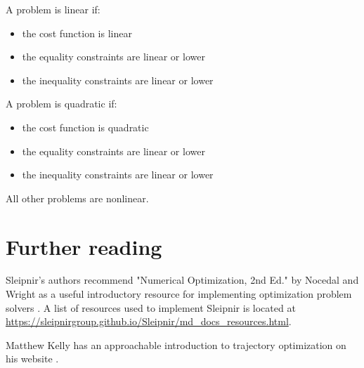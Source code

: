 A problem is linear if:
\begin{itemize}
  \item the cost function is linear
  \item the equality constraints are linear or lower
  \item the inequality constraints are linear or lower
\end{itemize}

A problem is quadratic if:
\begin{itemize}
  \item the cost function is quadratic
  \item the equality constraints are linear or lower
  \item the inequality constraints are linear or lower
\end{itemize}

All other problems are nonlinear.

\section{Further reading}

Sleipnir's authors recommend "Numerical Optimization, 2nd Ed." by Nocedal and
Wright as a useful introductory resource for implementing optimization problem
solvers \cite{bib:numerical_optimization}. A list of resources used to implement
Sleipnir is located at
\url{https://sleipnirgroup.github.io/Sleipnir/md_docs_resources.html}.

Matthew Kelly has an approachable introduction to trajectory optimization on his
website \cite{bib:intro_to_traj_opt}.
